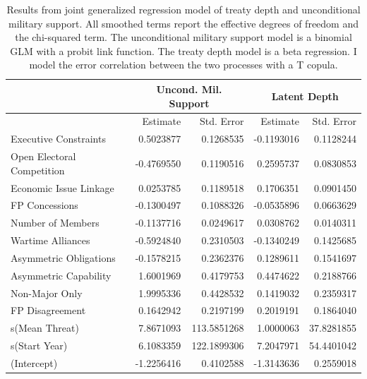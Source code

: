 \documentclass[12pt]{article}
\begin{document}
\begin{table}[ht]
\centering
\begin{tabular}{lrrrr}
  & \multicolumn{2}{c}{Uncond. Mil. Support} & \multicolumn{2}{c}{Latent Depth}\\ \hline
  & Estimate & Std. Error & Estimate & Std. Error \\ 
  \hline
  Executive Constraints & 0.5023877 & 0.1268535 & -0.1193016 & 0.1128244 \\ 
  Open Electoral Competition & -0.4769550 & 0.1190516 & 0.2595737 & 0.0830853 \\ 
  Economic Issue Linkage & 0.0253785 & 0.1189518 & 0.1706351 & 0.0901450 \\ 
  FP Concessions & -0.1300497 & 0.1088326 & -0.0535896 & 0.0663629 \\ 
  Number of Members & -0.1137716 & 0.0249617 & 0.0308762 & 0.0140311 \\ 
  Wartime Alliances & -0.5924840 & 0.2310503 & -0.1340249 & 0.1425685 \\ 
  Asymmetric Obligations & -0.1578215 & 0.2362376 & 0.1289611 & 0.1541697 \\ 
  Asymmetric Capability & 1.6001969 & 0.4179753 & 0.4474622 & 0.2188766 \\ 
  Non-Major Only & 1.9995336 & 0.4428532 & 0.1419032 & 0.2359317 \\ 
  FP Disagreement & 0.1642942 & 0.2197199 & 0.2019191 & 0.1864040 \\ 
  s(Mean Threat) & 7.8671093 & 113.5851268 & 1.0000063 & 37.8281855 \\ 
  s(Start Year) & 6.1083359 & 122.1899306 & 7.2047971 & 54.4401042 \\ 
  (Intercept) & -1.2256416 & 0.4102588 & -1.3143636 & 0.2559018 \\ 
   \hline
\end{tabular}
\caption{Results from joint generalized regression model of treaty depth and unconditional military support. 
                     All smoothed terms report the effective degrees of freedom and the chi-squared term. 
                     The unconditional military support model is a binomial GLM with a probit link function. 
                     The treaty depth model is a beta regression. 
                     I model the error correlation between the two processes with a T copula.} 
\label{tab:gjrm-res}
\end{table}
\end{document}
